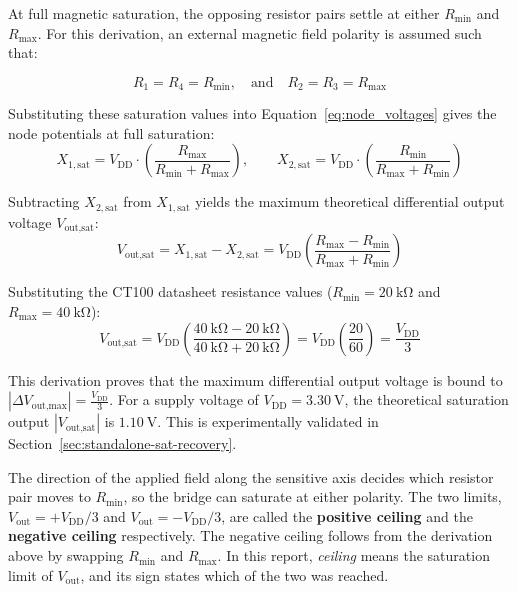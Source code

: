 \documentclass[12pt,a4paper]{article}
\begin{document}
 At full magnetic saturation, the opposing resistor pairs settle at either $R_{\min}$ and $R_{\max}$. For this derivation, an external magnetic field polarity is assumed such that:

\begin{equation}
R_1 = R_4 = R_{\min}, \quad \text{and} \quad R_2 = R_3 = R_{\max}
\label{eq:tmr-saturation-resistances}
\end{equation}

Substituting these saturation values into Equation~\ref{eq:node_voltages} gives the node potentials at full saturation:
\begin{equation}
    X_{1,\text{sat}} = V_{\text{DD}} \cdot \left( \frac{R_{\max}}{R_{\min} + R_{\max}} \right), \qquad X_{2,\text{sat}} = V_{\text{DD}} \cdot \left( \frac{R_{\min}}{R_{\max} + R_{\min}} \right)
\end{equation}

Subtracting $X_{2,\text{sat}}$ from $X_{1,\text{sat}}$ yields the maximum theoretical differential output voltage $V_{\text{out,sat}}$:
\begin{equation}
    V_{\text{out,sat}} = X_{1,\text{sat}} - X_{2,\text{sat}} = V_{\text{DD}} \left( \frac{R_{\max} - R_{\min}}{R_{\max} + R_{\min}} \right)
    \label{eq:vout_sat_derived}
\end{equation}

Substituting the CT100 datasheet resistance values \cite{ct100_datasheet} ($R_{\min} = \SI{20}{\kilo\ohm}$ and $R_{\max} = \SI{40}{\kilo\ohm}$):
\begin{equation}
    V_{\text{out,sat}} = V_{\text{DD}} \left( \frac{\SI{40}{\kilo\ohm} - \SI{20}{\kilo\ohm}}{\SI{40}{\kilo\ohm} + \SI{20}{\kilo\ohm}} \right) = V_{\text{DD}} \left( \frac{20}{60} \right) = \frac{V_{\text{DD}}}{3}
\end{equation}

This  derivation proves that the maximum differential output voltage is  bound to  $\left| \Delta V_{\text{out,max}} \right| = \frac{V_{\text{DD}}}{3}$. For a supply voltage of $V_{\text{DD}} = \SI{3.30}{\volt}$, the theoretical saturation output  $\left|V_{\text{out,sat}} \right|$ is $ \SI{1.10}{\volt}$. This is experimentally validated in Section~\ref{sec:standalone-sat-recovery}.

The direction of the applied field along the sensitive axis decides which resistor pair moves to $R_{\min}$, so the bridge can saturate at either polarity. The two limits, $V_{\text{out}} = +V_{\text{DD}}/3$ and $V_{\text{out}} = -V_{\text{DD}}/3$, are called the \textbf{positive ceiling} and the \textbf{negative ceiling} respectively. The negative ceiling follows from the derivation above by swapping $R_{\min}$ and $R_{\max}$. In this report, \emph{ceiling} means the saturation limit of $V_{\text{out}}$, and its sign states which of the two was reached.
\end{document}
